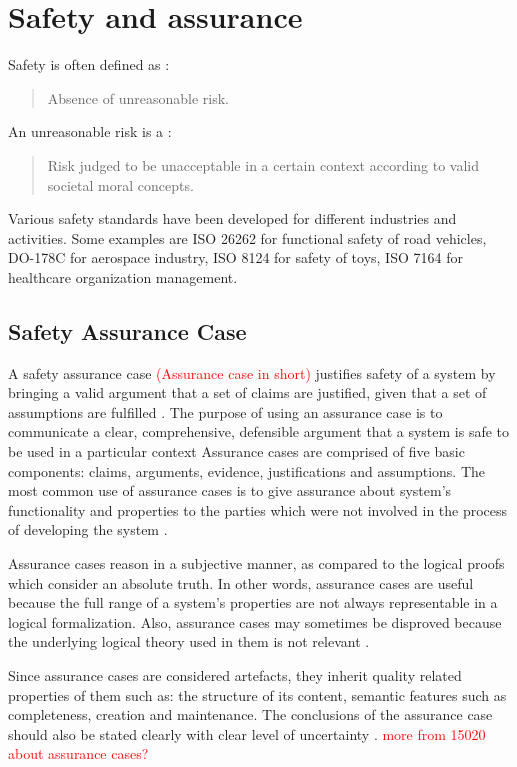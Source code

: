\chapter{Safety and assurance}
Safety is often defined as \cite{organization2018iso}:
\begin{quotation}
Absence of unreasonable risk.
\end{quotation}  
An unreasonable risk is a \cite{organization2018iso}:
\begin{quotation}
Risk judged to be unacceptable in a certain context according to valid societal moral concepts.
\end{quotation}
Various safety standards have been developed for different industries and activities. Some examples are ISO 26262 for functional safety of road vehicles, DO-178C for aerospace industry, ISO 8124 for safety of toys, ISO 7164 for healthcare organization management.

\section{Safety Assurance Case}
A safety assurance case \textcolor{red}{(Assurance case in short)} justifies safety of a system by bringing a valid argument that a set of claims are justified, given that a set of assumptions are fulfilled \cite{Burton}. The purpose of using an assurance case is to communicate a clear, comprehensive, defensible argument that a system is safe to be used in a particular context \cite{gsn2004Kelly} Assurance cases are comprised of five basic components: claims, arguments, evidence, justifications and assumptions. The most common use of assurance cases is to give assurance about system's functionality and properties to the parties which were not involved in the process of developing the system \cite{iso15026-1-2019}.

Assurance cases reason in a subjective manner, as compared to the logical proofs which consider an absolute truth. In other words, assurance cases are useful because the full range of a system's properties are not always representable in a logical formalization. Also, assurance cases may sometimes be disproved because the underlying logical theory used in them is not relevant \cite{iso15026-1-2019}.

Since assurance cases are considered artefacts, they inherit quality related properties of them such as: the structure of its content, semantic features such as completeness, creation and maintenance. The conclusions of the assurance case should also be stated clearly with clear level of uncertainty \cite{iso15026-1-2019}. \textcolor{red}{more from 15020 about assurance cases?}

